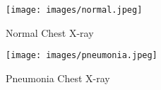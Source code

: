  \begin{figure}[H]
	\centering
	\texttt{[image: images/normal.jpeg]}
	\caption{Normal Chest X-ray}
	\label{fig:normalX-ray}
\end{figure}

\begin{figure}[H]
	\centering
	\texttt{[image: images/pneumonia.jpeg]}
	\caption{Pneumonia Chest X-ray}
	\label{fig:pneumoniaX-ray}
\end{figure}






